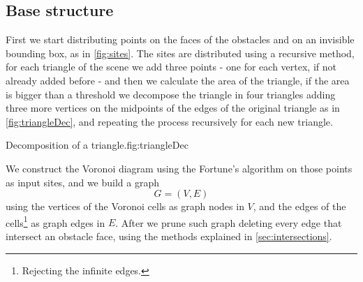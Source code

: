 \documentclass[dissertation.tex]{subfiles}
\begin{document}
\subsection{Base structure}
First we
start distributing points on the faces of the obstacles and on
an invisible bounding box, as in \cref{fig:sites}.
The sites are distributed using a recursive method, for each triangle
of the scene we add three points - one for each
vertex, if not already added before - and then we calculate the area
of the triangle, if the area is bigger than a threshold we decompose
the triangle in four triangles adding three more vertices on the
midpoints of the edges of the original triangle as in
\cref{fig:triangleDec}, and repeating the process recursively for
each new triangle.
\begin{myfig}{Decomposition of a triangle.}{fig:triangleDec}
\end{myfig}

We construct the Voronoi diagram using the Fortune's algorithm
\cite{fortune} on
those points as input sites, and we build a graph
$$G=(V,E)$$
using the vertices
of the Voronoi cells as graph nodes in $V$, and the edges of the cells\footnote{Rejecting the
  infinite edges.} as graph edges in $E$. After we prune such graph deleting every edge that
intersect an obstacle face, using the methods explained in \cref{sec:intersections}.
\end{document}
